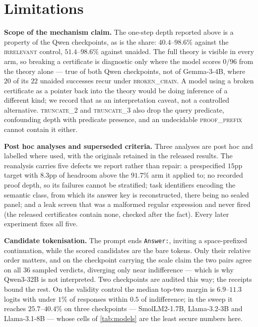 \documentclass{article}
\begin{document}
\section{Limitations}

\textbf{Scope of the mechanism claim.} The one-step depth reported above is a
property of the Qwen checkpoints, as is the share: $40.4$--$98.6\%$ against
the \textsc{irrelevant} control, $51.4$--$98.6\%$ against unaided. The full
theory is visible in every arm, so breaking a certificate is diagnostic only
where the model scores $0/96$ from the theory alone --- true of both Qwen
checkpoints, not of Gemma-3-4B, where $20$ of its $22$ unaided successes recur
under \textsc{broken\_chain}. A model using a broken
certificate as a pointer back into the theory would be doing inference of a
different kind; we record that as an interpretation caveat, not a controlled
alternative. \textsc{truncate\_2} and \textsc{truncate\_3} also drop the query
predicate, confounding depth with predicate presence, and an undecidable
\textsc{proof\_prefix} cannot contain it either.

\textbf{Post hoc analyses and superseded criteria.} Three analyses are post hoc
and labelled where used, with the originals retained in the released results.
The reanalysis carries five defects we report rather than repair: a prespecified
$15$pp target with $8.3$pp of headroom above the $91.7\%$ arm it applied to; no
recorded proof depth, so its failures cannot be stratified; task identifiers
encoding the semantic class, from which its answer key is reconstructed, there
being no sealed panel; and a leak screen that was a malformed regular expression
and never fired (the released certificates contain none, checked after the
fact). Every later experiment fixes all five.

\textbf{Candidate tokenisation.} The prompt ends \texttt{Answer:}, inviting a
space-prefixed continuation, while the scored candidates are the bare tokens.
Only their relative order matters, and on the checkpoint carrying the scale
claim the two pairs agree on all $36$ sampled verdicts, diverging only near
indifference --- which is why Qwen3-32B is not interpreted. Two checkpoints are
audited this way; the receipts bound the rest. On the validity control the
median top-two margin is $6.9$--$11.3$ logits with under $1\%$ of responses
within $0.5$ of indifference; in the sweep it reaches $25.7$--$40.4\%$ on three
checkpoints --- SmolLM2-1.7B, Llama-3.2-3B and Llama-3.1-8B --- whose cells of
\cref{tab:models} are the least secure numbers here.
\end{document}
